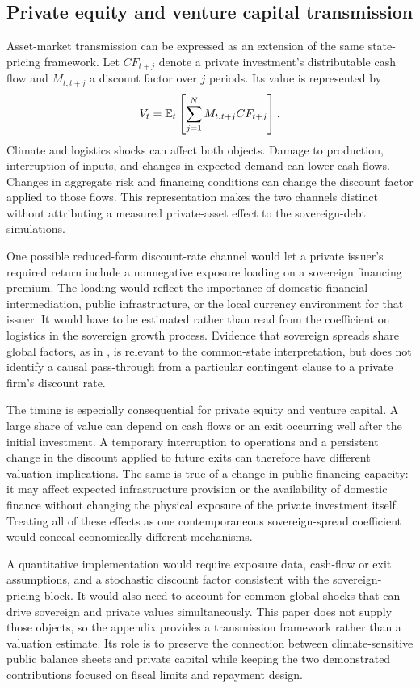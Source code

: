 \subsection{Private equity and venture capital transmission}\label{app:pevc}
Asset-market transmission can be expressed as an extension of the same state-pricing framework. Let $CF_{t+j}$ denote a private investment's distributable cash flow and $M_{t,t+j}$ a discount factor over $j$ periods. Its value is represented by
\begin{equation}\label{eq:private_value}
 V_t=\mathbb E_t\left[\sum_{j=1}^{N}M_{t,t+j}CF_{t+j}\right].
\end{equation}
Climate and logistics shocks can affect both objects. Damage to production, interruption of inputs, and changes in expected demand can lower cash flows. Changes in aggregate risk and financing conditions can change the discount factor applied to those flows. This representation makes the two channels distinct without attributing a measured private-asset effect to the sovereign-debt simulations.

One possible reduced-form discount-rate channel would let a private issuer's required return include a nonnegative exposure loading on a sovereign financing premium. The loading would reflect the importance of domestic financial intermediation, public infrastructure, or the local currency environment for that issuer. It would have to be estimated rather than read from the coefficient on logistics in the sovereign growth process. Evidence that sovereign spreads share global factors, as in \textcite{LongstaffEtAl2011}, is relevant to the common-state interpretation, but does not identify a causal pass-through from a particular contingent clause to a private firm's discount rate.

The timing is especially consequential for private equity and venture capital. A large share of value can depend on cash flows or an exit occurring well after the initial investment. A temporary interruption to operations and a persistent change in the discount applied to future exits can therefore have different valuation implications. The same is true of a change in public financing capacity: it may affect expected infrastructure provision or the availability of domestic finance without changing the physical exposure of the private investment itself. Treating all of these effects as one contemporaneous sovereign-spread coefficient would conceal economically different mechanisms.

A quantitative implementation would require exposure data, cash-flow or exit assumptions, and a stochastic discount factor consistent with the sovereign-pricing block. It would also need to account for common global shocks that can drive sovereign and private values simultaneously. This paper does not supply those objects, so the appendix provides a transmission framework rather than a valuation estimate. Its role is to preserve the connection between climate-sensitive public balance sheets and private capital while keeping the two demonstrated contributions focused on fiscal limits and repayment design.
